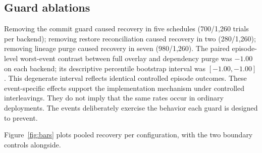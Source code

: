 ﻿\documentclass[sigconf,nonacm]{acmart}
\begin{document}
\subsection{Guard ablations}
Removing the commit guard caused recovery in five schedules (700/1,260 trials per backend); removing restore reconciliation caused recovery in two (280/1,260); removing lineage purge caused recovery in seven (980/1,260). The paired episode-level worst-event contrast between full overlay and dependency purge was $-1.00$ on each backend; its descriptive percentile bootstrap interval was $[-1.00,-1.00]$. This degenerate interval reflects identical controlled episode outcomes. These event-specific effects support the implementation mechanism under controlled interleavings. They do not imply that the same rates occur in ordinary deployments. The events deliberately exercise the behavior each guard is designed to prevent.

Figure~\ref{fig:bars} plots pooled recovery per configuration, with the two boundary controls alongside.
\end{document}
